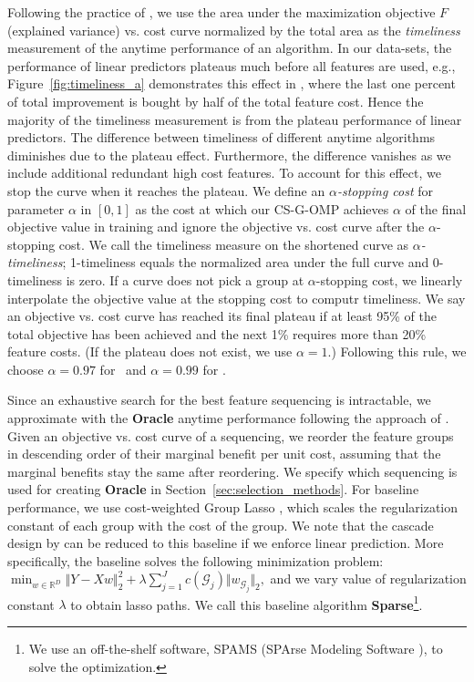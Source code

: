Following the practice of \cite{timeliness}, we use the area under the 
maximization objective $F$ (explained variance) vs. cost curve normalized by the total area as the 
\textit{timeliness} measurement of the anytime performance of an algorithm. In our data-sets, the performance of linear predictors plateaus much before
all features are used, e.g., Figure~\ref{fig:timeliness_a} demonstrates this effect in \YahooLTR, where the last one percent of total improvement is bought by half of the total feature cost. Hence the majority of the timeliness measurement is from the plateau performance of linear predictors. The difference between timeliness of different anytime algorithms diminishes due to the plateau effect. Furthermore, the difference vanishes as we include additional redundant high cost features. To account for this effect, we 
stop the curve when it reaches the plateau.
We define an \textit{$\alpha$-stopping cost} for parameter $\alpha$ in $[0,1]$ as the cost at which our CS-G-OMP achieves $\alpha$ of the final objective value in training and ignore the objective vs. cost curve after
the $\alpha$-stopping cost. We call the timeliness measure on the shortened curve 
as \textit{$\alpha$-timeliness}; 1-timeliness equals the normalized area under the full curve and 0-timeliness is zero. If a curve does not pick a group at $\alpha$-stopping cost, we linearly interpolate the objective value at the stopping cost to 
computr timeliness. 
We say an objective vs. cost curve has reached its final plateau if at least 95\% of the total 
objective has been achieved and the next 1\% requires more than 20\%
feature costs. (If the plateau does not exist, we use $\alpha = 1$.) Following this rule, we choose $\alpha = 0.97$ for \Grain\ and $\alpha = 0.99$ for \YahooLTR.

Since an exhaustive search for the best feature sequencing is intractable, 
we approximate with the \textbf{Oracle} anytime performance following the approach of \cite{timeliness}. Given an objective vs. cost curve of a sequencing, we reorder the feature groups in descending order of their marginal benefit per unit cost, assuming that the marginal benefits stay the same after reordering. We specify which sequencing is used for creating \textbf{Oracle} in Section~\ref{sec:selection_methods}. 
For baseline performance, we use cost-weighted Group Lasso \citep{group_lasso}, which
scales the regularization constant of each group with the cost of the group. We note that the cascade design by 
\cite{chen:12} can be reduced to this baseline if we enforce
linear prediction. 
More specifically, the baseline solves the following minimization problem:
\mbox{$
  \min _{w \in \mathbb{R}^{D}} \Vert Y -
    Xw \Vert^2_2 + \lambda
    \sum _{j=1}^J c(\mathcal{G}_j) \Vert w _{\mathcal{G}_j} \Vert _2,
$}
and we vary value of regularization constant
$\lambda$ to obtain lasso paths. We call this baseline algorithm \textbf{Sparse}\footnote{We use an off-the-shelf software, 
SPAMS (SPArse Modeling Software \citep{spams}), to solve the optimization.}.


